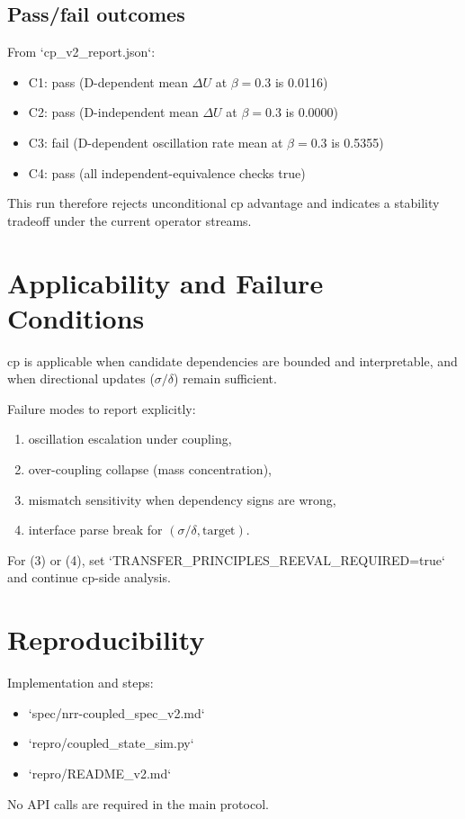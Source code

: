 \documentclass[11pt,a4paper]{article}
\begin{document}
\subsection{Pass/fail outcomes}
From `cp\_v2\_report.json`:
\begin{itemize}
  \item C1: pass (D-dependent mean \(\Delta U\) at \(\beta=0.3\) is 0.0116)
  \item C2: pass (D-independent mean \(\Delta U\) at \(\beta=0.3\) is 0.0000)
  \item C3: fail (D-dependent oscillation rate mean at \(\beta=0.3\) is 0.5355)
  \item C4: pass (all independent-equivalence checks true)
\end{itemize}
This run therefore rejects unconditional cp advantage and indicates a stability tradeoff under the current operator streams.

\section{Applicability and Failure Conditions}
cp is applicable when candidate dependencies are bounded and interpretable, and when directional updates (\(\sigma/\delta\)) remain sufficient.

Failure modes to report explicitly:
\begin{enumerate}
  \item oscillation escalation under coupling,
  \item over-coupling collapse (mass concentration),
  \item mismatch sensitivity when dependency signs are wrong,
  \item interface parse break for \((\sigma/\delta,\text{target})\).
\end{enumerate}
For (3) or (4), set `TRANSFER\_PRINCIPLES\_REEVAL\_REQUIRED=true` and continue cp-side analysis.

\section{Reproducibility}
Implementation and steps:
\begin{itemize}
  \item `spec/nrr-coupled\_spec\_v2.md`
  \item `repro/coupled\_state\_sim.py`
  \item `repro/README\_v2.md`
\end{itemize}
No API calls are required in the main protocol.
\end{document}
